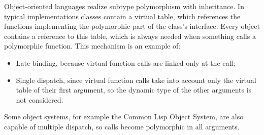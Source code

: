 \documentclass[margin=0px]{article}
\begin{document}
Object-oriented languages realize subtype polymorphism with inheritance. In typical implementations classes contain a virtual table, which references the functions implementing the polymorphic part of the class's interface. Every object contains a reference to this table, which is always needed when something calls a polymorphic function. This mechanism is an example of:
\begin{itemize}
    \item Late binding, because virtual function calls are linked only at the call;
    \item Single dispatch, since virtual function calls take into account only the virtual table of their first argument, so the dynamic type of the other arguments is not considered.
\end{itemize}

Some object systems, for example the Common Lisp Object System, are also capable of multiple dispatch, so calls become polymorphic in all arguments.
\end{document}
